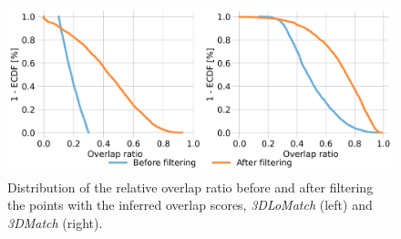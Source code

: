 \begin{figure}[t]
    \centering
    \includegraphics[width=0.8\columnwidth]{figures/images/improve_overlap.png}
    \caption{Distribution of the relative overlap ratio before and after filtering the points with the inferred overlap scores, \textit{3DLoMatch} (left) and \textit{3DMatch} (right).}
    \label{fig:imp_overlap}
    
\end{figure}